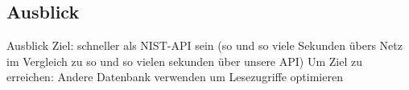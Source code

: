\subsection{Ausblick} \label{subsec:Ausblick}
Ausblick
Ziel: schneller als \ac{NIST}-\ac{API} sein (so und so viele Sekunden übers Netz im Vergleich zu so und so vielen sekunden über unsere \ac{API})
Um Ziel zu erreichen: Andere Datenbank verwenden um Lesezugriffe optimieren